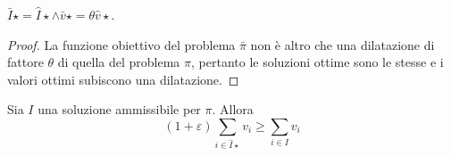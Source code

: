 \begin{lemma}\label{lem:knap_barhat}
	$\bar I\star = \hat I\star \land \bar v\star = \theta\hat v\star$.
\end{lemma}
\begin{proof}
	La funzione obiettivo del problema $\bar\pi$ non è altro che una dilatazione di fattore $\theta$ di quella del problema $\hat\pi$, pertanto le soluzioni ottime sono le stesse e i valori ottimi subiscono una dilatazione.
\end{proof}

\begin{lemma}
	Sia $I$ una soluzione ammissibile per $\pi$. Allora
	\begin{equation*}
		(1+\varepsilon)\sum_{i\in\hat I\star} v_i \geq \sum_{i\in I} v_i
	\end{equation*}
\end{lemma}
